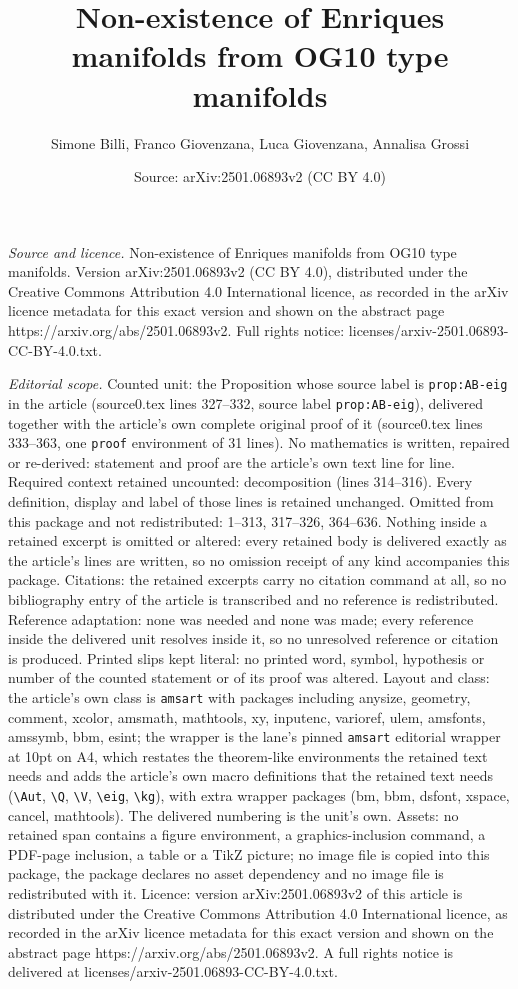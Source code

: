 \documentclass[10pt,a4paper]{amsart}
\title[Non-existence of Enriques manifolds from OG10 type manifolds]{Non-existence of Enriques manifolds from OG10 type manifolds}
\author{Simone Billi, Franco Giovenzana, Luca Giovenzana, Annalisa Grossi}
\date{Source: arXiv:2501.06893v2 (CC BY 4.0)}
\begin{document}
\maketitle

\noindent\emph{Source and licence.} Non-existence of Enriques manifolds from OG10 type manifolds. Version arXiv:2501.06893v2 (CC BY 4.0), distributed under the Creative Commons Attribution 4.0 International licence, as recorded in the arXiv licence metadata for this exact version and shown on the abstract page https://arxiv.org/abs/2501.06893v2. Full rights notice: licenses/arxiv-2501.06893-CC-BY-4.0.txt.\par\smallskip

\noindent\textit{Editorial scope.} Counted unit: the Proposition whose source label is \texttt{prop:AB-eig} in the article (source0.tex lines 327--332, source label \texttt{prop:AB-eig}), delivered together with the article's own complete original proof of it (source0.tex lines 333--363, one \texttt{proof} environment of 31 lines). No mathematics is written, repaired or re-derived: statement and proof are the article's own text line for line. Required context retained uncounted: decomposition (lines 314--316). Every definition, display and label of those lines is retained unchanged. Omitted from this package and not redistributed: 1--313, 317--326, 364--636. Nothing inside a retained excerpt is omitted or altered: every retained body is delivered exactly as the article's lines are written, so no omission receipt of any kind accompanies this package. Citations: the retained excerpts carry no citation command at all, so no bibliography entry of the article is transcribed and no reference is redistributed. Reference adaptation: none was needed and none was made; every reference inside the delivered unit resolves inside it, so no unresolved reference or citation is produced. Printed slips kept literal: no printed word, symbol, hypothesis or number of the counted statement or of its proof was altered. Layout and class: the article's own class is \texttt{amsart} with packages including anysize, geometry, comment, xcolor, amsmath, mathtools, xy, inputenc, varioref, ulem, amsfonts, amssymb, bbm, esint; the wrapper is the lane's pinned \texttt{amsart} editorial wrapper at 10pt on A4, which restates the theorem-like environments the retained text needs and adds the article's own macro definitions that the retained text needs (\texttt{\textbackslash Aut}, \texttt{\textbackslash Q}, \texttt{\textbackslash V}, \texttt{\textbackslash eig}, \texttt{\textbackslash kg}), with extra wrapper packages (bm, bbm, dsfont, xspace, cancel, mathtools). The delivered numbering is the unit's own. Assets: no retained span contains a figure environment, a graphics-inclusion command, a PDF-page inclusion, a table or a TikZ picture; no image file is copied into this package, the package declares no asset dependency and no image file is redistributed with it. Licence: version arXiv:2501.06893v2 of this article is distributed under the Creative Commons Attribution 4.0 International licence, as recorded in the arXiv licence metadata for this exact version and shown on the abstract page https://arxiv.org/abs/2501.06893v2. A full rights notice is delivered at licenses/arxiv-2501.06893-CC-BY-4.0.txt. 
\end{document}
